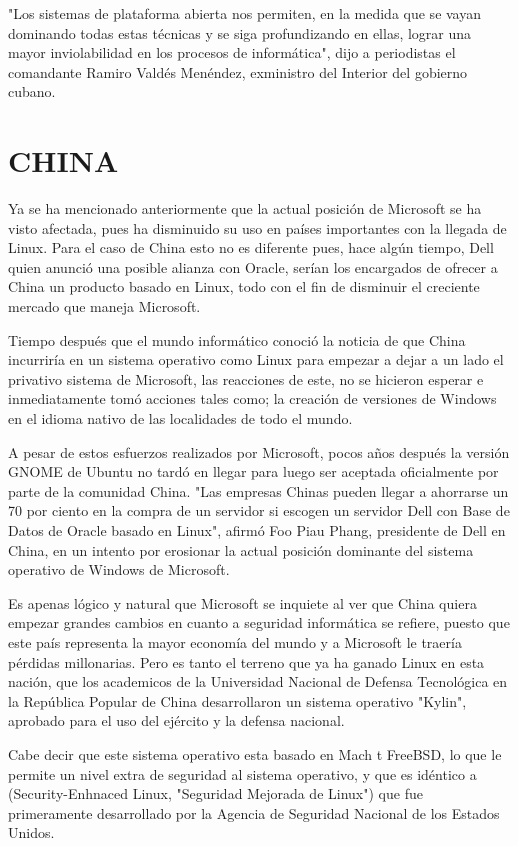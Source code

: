 "Los sistemas de plataforma abierta nos permiten, en la medida que se vayan dominando todas estas técnicas y se siga profundizando en ellas, lograr una mayor inviolabilidad en 
los procesos de informática", dijo a periodistas el comandante Ramiro Valdés Menéndez, exministro del Interior del gobierno cubano.


\section*{CHINA}
Ya se ha mencionado anteriormente que la actual posición de Microsoft se ha visto afectada, pues ha disminuido su uso en países importantes con la llegada de Linux. Para el caso 
de China esto no es diferente pues, hace algún tiempo, Dell quien anunció una posible alianza con Oracle, serían los encargados de ofrecer a China un producto basado en Linux, 
todo con el fin de disminuir el creciente mercado que maneja Microsoft.

Tiempo después que el mundo informático conoció la noticia de que China incurriría en un sistema operativo como Linux para empezar a dejar a un lado el privativo sistema de 
Microsoft, las reacciones de este, no se hicieron esperar e inmediatamente tomó acciones tales como; la creación de versiones de Windows en el idioma nativo de las localidades de 
todo el mundo.

A pesar de estos esfuerzos realizados por Microsoft, pocos años después la versión GNOME de Ubuntu no tardó en llegar para luego ser aceptada oficialmente por parte de la 
comunidad China. "Las empresas Chinas pueden llegar a ahorrarse un 70 por ciento en la compra de un servidor si escogen un servidor Dell con Base de Datos de Oracle basado en 
Linux", afirmó Foo Piau Phang, presidente de Dell en China, en un intento por erosionar la actual posición dominante del sistema operativo de Windows de Microsoft.

Es apenas lógico y natural que Microsoft se inquiete al ver que China quiera empezar grandes cambios en cuanto a seguridad informática se refiere, puesto que este país representa 
la mayor economía del mundo y a Microsoft le traería pérdidas millonarias. Pero es tanto el terreno que ya ha ganado Linux en esta nación, que los academicos de la Universidad 
Nacional de Defensa Tecnológica en la República Popular de China desarrollaron un sistema operativo "Kylin", aprobado para el uso del ejército y la defensa nacional.

Cabe decir que este sistema operativo esta basado en Mach t FreeBSD, lo que le permite un nivel extra de seguridad al sistema operativo, y que es idéntico a (Security-Enhnaced 
Linux, "Seguridad Mejorada de Linux") que fue primeramente desarrollado por la Agencia de Seguridad Nacional de los Estados Unidos.


